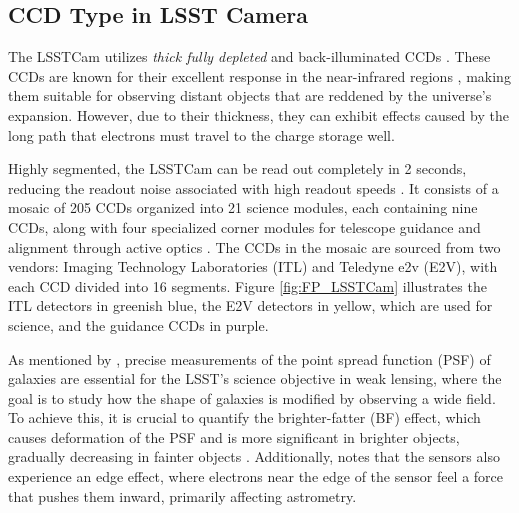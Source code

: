 \subsection{CCD Type in LSST Camera}

The LSSTCam utilizes \textit{thick fully depleted} and back-illuminated CCDs \citep{10.71929/rubin/2571927}. These CCDs are known for their excellent response in the near-infrared regions \citep{2017JInst..12C3091L}, making them suitable for observing distant objects that are reddened by the universe's expansion. However, due to their thickness, they can exhibit effects caused by the long path that electrons must travel to the charge storage well.

\vspace{3mm}
Highly segmented, the LSSTCam can be read out completely in 2 seconds, reducing the readout noise associated with high readout speeds \citep{2009arXiv0912.0201L}. It consists of a mosaic of 205 CCDs organized into 21 science modules, each containing nine CCDs, along with four specialized corner modules for telescope guidance and alignment through active optics \citep{2020SPIE11454E..39S}. The CCDs in the mosaic are sourced from two vendors: Imaging Technology Laboratories (ITL) and Teledyne e2v (E2V), with each CCD divided into 16 segments. Figure \ref{fig:FP_LSSTCam} illustrates the ITL detectors in greenish blue, the E2V detectors in yellow, which are used for science, and the guidance CCDs in purple.

\vspace{3mm}
As mentioned by \cite{2015JInst..10C5015W}, precise measurements of the point spread function (PSF) of galaxies are essential for the LSST's science objective in weak lensing, where the goal is to study how the shape of galaxies is modified by observing a wide field. To achieve this, it is crucial to quantify the brighter-fatter (BF) effect, which causes deformation of the PSF and is more significant in brighter objects, gradually decreasing in fainter objects \citep{2017JInst..12C3091L}. Additionally, \cite{2015JInst..10C5015W} notes that the sensors also experience an edge effect, where electrons near the edge of the sensor feel a force that pushes them inward, primarily affecting astrometry.


